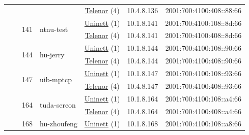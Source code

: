 \begin{small}
\begin{center}
\begin{longtable}{|c|c|c|c|c|c|c|c|}
  &  &  &  & \multicolumn{2}{|c|}{\tiny{\href{https://www.telenor.no}{Telenor} (4)}} & \tiny{10.4.8.136} & \tiny{2001:700:4100:408::88:66} \\* \cline{3-3}\cline{4-4}\cline{5-5}\cline{6-6}\cline{7-7}\cline{8-8}
  &  & \multirow{2}{*}{\tiny{141}} & \multicolumn{1}{|l|}{\multirow{2}{*}{\tiny{ntnu-test}}} & \multicolumn{2}{|c|}{\tiny{\href{https://www.uninett.no}{Uninett} (1)}} & \tiny{10.1.8.141} & \tiny{2001:700:4100:108::8d:66} \\* \cline{5-5}\cline{6-6}\cline{7-7}\cline{8-8}
  &  &  &  & \multicolumn{2}{|c|}{\tiny{\href{https://www.telenor.no}{Telenor} (4)}} & \tiny{10.4.8.141} & \tiny{2001:700:4100:408::8d:66} \\* \cline{3-3}\cline{4-4}\cline{5-5}\cline{6-6}\cline{7-7}\cline{8-8}
  &  & \multirow{2}{*}{\tiny{144}} & \multicolumn{1}{|l|}{\multirow{2}{*}{\tiny{hu-jerry}}} & \multicolumn{2}{|c|}{\tiny{\href{https://www.uninett.no}{Uninett} (1)}} & \tiny{10.1.8.144} & \tiny{2001:700:4100:108::90:66} \\* \cline{5-5}\cline{6-6}\cline{7-7}\cline{8-8}
  &  &  &  & \multicolumn{2}{|c|}{\tiny{\href{https://www.telenor.no}{Telenor} (4)}} & \tiny{10.4.8.144} & \tiny{2001:700:4100:408::90:66} \\* \cline{3-3}\cline{4-4}\cline{5-5}\cline{6-6}\cline{7-7}\cline{8-8}
  &  & \multirow{2}{*}{\tiny{147}} & \multicolumn{1}{|l|}{\multirow{2}{*}{\tiny{uib-mptcp}}} & \multicolumn{2}{|c|}{\tiny{\href{https://www.uninett.no}{Uninett} (1)}} & \tiny{10.1.8.147} & \tiny{2001:700:4100:108::93:66} \\* \cline{5-5}\cline{6-6}\cline{7-7}\cline{8-8}
  &  &  &  & \multicolumn{2}{|c|}{\tiny{\href{https://www.telenor.no}{Telenor} (4)}} & \tiny{10.4.8.147} & \tiny{2001:700:4100:408::93:66} \\* \cline{3-3}\cline{4-4}\cline{5-5}\cline{6-6}\cline{7-7}\cline{8-8}
  &  & \multirow{2}{*}{\tiny{164}} & \multicolumn{1}{|l|}{\multirow{2}{*}{\tiny{tuda-sereon}}} & \multicolumn{2}{|c|}{\tiny{\href{https://www.uninett.no}{Uninett} (1)}} & \tiny{10.1.8.164} & \tiny{2001:700:4100:108::a4:66} \\* \cline{5-5}\cline{6-6}\cline{7-7}\cline{8-8}
  &  &  &  & \multicolumn{2}{|c|}{\tiny{\href{https://www.telenor.no}{Telenor} (4)}} & \tiny{10.4.8.164} & \tiny{2001:700:4100:408::a4:66} \\* \cline{3-3}\cline{4-4}\cline{5-5}\cline{6-6}\cline{7-7}\cline{8-8}
  &  & \multirow{2}{*}{\tiny{168}} & \multicolumn{1}{|l|}{\multirow{2}{*}{\tiny{hu-zhoufeng}}} & \multicolumn{2}{|c|}{\tiny{\href{https://www.uninett.no}{Uninett} (1)}} & \tiny{10.1.8.168} & \tiny{2001:700:4100:108::a8:66} \\* \cline{5-5}\cline{6-6}\cline{7-7}\cline{8-8}

\end{longtable}
\end{center}
\end{small}
